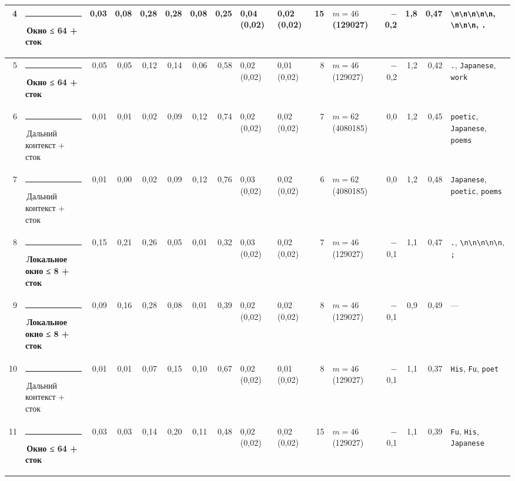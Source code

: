 \documentclass[10pt]{article}
\begin{document}
\begin{minipage}{\linewidth}
\begin{center}
{\begin{tabular}{|r|l|r|r|r|r|r|r|l|l|r|l|r|r|r|l|}
4 & \textcolor[HTML]{EDA100}{\rule{0.62em}{0.62em}}\,\textbf{Окно ≤ 64 + сток} & 0,03 & 0,08 & 0,28 & 0,28 & 0,08 & 0,25 & 0,04 (0,02) & 0,02 (0,02) & 15 & $m{=}46$ (129027) & $-$0,2 & 1,8 & 0,47 & \texttt{\textvisiblespace{}\textbackslash{}n\textbackslash{}n\textbackslash{}n\textbackslash{}n\textbackslash{}n}, \texttt{\textvisiblespace{}\textbackslash{}n\textbackslash{}n\textbackslash{}n}, \texttt{\textvisiblespace{}.} \\ \hline
5 & \textcolor[HTML]{EDA100}{\rule{0.62em}{0.62em}}\,\textbf{Окно ≤ 64 + сток} & 0,05 & 0,05 & 0,12 & 0,14 & 0,06 & 0,58 & 0,02 (0,02) & 0,01 (0,02) & 8 & $m{=}46$ (129027) & $-$0,2 & 1,2 & 0,42 & \texttt{\textvisiblespace{}.}, \texttt{\textvisiblespace{}Japanese}, \texttt{\textvisiblespace{}work} \\ \hline
6 & \textcolor[HTML]{C3C2B7}{\rule{0.62em}{0.62em}}\,Дальний контекст + сток & 0,01 & 0,01 & 0,02 & 0,09 & 0,12 & 0,74 & 0,02 (0,02) & 0,02 (0,02) & 7 & $m{=}62$ (4080185) & 0,0 & 1,2 & 0,45 & \texttt{\textvisiblespace{}poetic}, \texttt{\textvisiblespace{}Japanese}, \texttt{\textvisiblespace{}poems} \\ \hline
7 & \textcolor[HTML]{C3C2B7}{\rule{0.62em}{0.62em}}\,Дальний контекст + сток & 0,01 & 0,00 & 0,02 & 0,09 & 0,12 & 0,76 & 0,03 (0,02) & 0,02 (0,02) & 6 & $m{=}62$ (4080185) & 0,0 & 1,2 & 0,48 & \texttt{\textvisiblespace{}Japanese}, \texttt{\textvisiblespace{}poetic}, \texttt{\textvisiblespace{}poems} \\ \hline
8 & \textcolor[HTML]{1BAF7A}{\rule{0.62em}{0.62em}}\,\textbf{Локальное окно ≤ 8 + сток} & 0,15 & 0,21 & 0,26 & 0,05 & 0,01 & 0,32 & 0,03 (0,02) & 0,02 (0,02) & 7 & $m{=}46$ (129027) & $-$0,1 & 1,1 & 0,47 & \texttt{\textvisiblespace{}.}, \texttt{\textvisiblespace{}\textbackslash{}n\textbackslash{}n\textbackslash{}n\textbackslash{}n\textbackslash{}n}, \texttt{\textvisiblespace{};} \\ \hline
9 & \textcolor[HTML]{1BAF7A}{\rule{0.62em}{0.62em}}\,\textbf{Локальное окно ≤ 8 + сток} & 0,09 & 0,16 & 0,28 & 0,08 & 0,01 & 0,39 & 0,02 (0,02) & 0,02 (0,02) & 8 & $m{=}46$ (129027) & $-$0,1 & 0,9 & 0,49 & — \\ \hline
10 & \textcolor[HTML]{C3C2B7}{\rule{0.62em}{0.62em}}\,Дальний контекст + сток & 0,01 & 0,01 & 0,07 & 0,15 & 0,10 & 0,67 & 0,02 (0,02) & 0,01 (0,02) & 8 & $m{=}46$ (129027) & $-$0,1 & 1,1 & 0,37 & \texttt{\textvisiblespace{}His}, \texttt{\textvisiblespace{}Fu}, \texttt{\textvisiblespace{}poet} \\ \hline
11 & \textcolor[HTML]{EDA100}{\rule{0.62em}{0.62em}}\,\textbf{Окно ≤ 64 + сток} & 0,03 & 0,03 & 0,14 & 0,20 & 0,11 & 0,48 & 0,02 (0,02) & 0,02 (0,02) & 15 & $m{=}46$ (129027) & $-$0,1 & 1,1 & 0,39 & \texttt{\textvisiblespace{}Fu}, \texttt{\textvisiblespace{}His}, \texttt{\textvisiblespace{}Japanese} \\ \hline

\end{tabular}}
\end{center}
\end{minipage}
\end{document}
